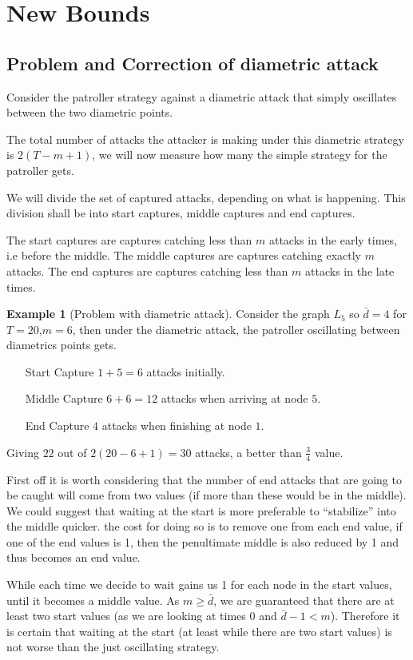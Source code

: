 \documentclass[a4paper,10pt]{article}
\theoremstyle{definition}
\theoremstyle{definition}
\newtheorem{example}[theorem]{Example}
\theoremstyle{remark}
\theoremstyle{definition}
\begin{document}
%
\section{New Bounds}

\subsection{Problem and Correction of diametric attack}
Consider the patroller strategy against a diametric attack that simply oscillates between the two diametric points.

The total number of attacks the attacker is making under this diametric strategy is $2(T-m+1)$, we will now measure how many the simple strategy for the patroller gets.

We will divide the set of captured attacks, depending on what is happening. This division shall be into start captures, middle captures and end captures.

The start captures are captures catching less than $m$ attacks in the early times, i.e before the middle. The middle captures are captures catching exactly $m$ attacks. The end captures are captures catching less than $m$ attacks in the late times.

\begin{example}[Problem with diametric attack]
Consider the graph $L_{5}$ so $\bar{d}=4$ for $T=20$,$m=6$, then under the diametric attack, the patroller oscillating between diametrics points gets.
\begin{itemize}
\item[Start] Capture $1+5=6$ attacks initially.
\item[Middle] Capture $6+6=12$ attacks when arriving at node $5$.
\item[End] Capture $4$ attacks when finishing at node $1$.
\end{itemize}
Giving $22$ out of $2(20-6+1)=30$ attacks, a better than $\frac{3}{4}$ value.
\end{example}

First off it is worth considering that the number of end attacks that are going to be caught will come from two values (if more than these would be in the middle). We could suggest that waiting at the start is more preferable to ``stabilize'' into the middle quicker. the cost for doing so is to remove one from each end value, if one of the end values is 1, then the penultimate middle is also reduced by 1 and thus becomes an end value.

While each time we decide to wait gains us 1 for each node in the start values, until it becomes a middle value. As $m \geq \bar{d}$, we are guaranteed that there are at least two start values (as we are looking at times $0$ and $\bar{d}-1 < m$). Therefore it is certain that waiting at the start (at least while there are two start values) is not worse than the just oscillating strategy.
\end{document}
